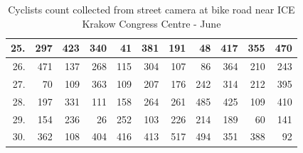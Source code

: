 \begin{table}[H]
{\begin{tabular}{|r|r|r|r|r|r|r|r|r|r|r|}
25.                    & 297                            & 423                             & 340                              & 41                               & 381                              & 191                              & 48                               & 417                              & 355                              & 470                              \\ \hline
26.                    & 471                            & 137                             & 268                              & 115                              & 304                              & 107                              & 86                               & 364                              & 210                              & 243                              \\ \hline
27.                    & 70                             & 109                             & 363                              & 109                              & 207                              & 176                              & 242                              & 314                              & 212                              & 395                              \\ \hline
28.                    & 197                            & 331                             & 111                              & 158                              & 264                              & 261                              & 485                              & 425                              & 109                              & 410                              \\ \hline
29.                    & 154                            & 236                             & 26                               & 252                              & 103                              & 226                              & 214                              & 189                              & 60                               & 141                              \\ \hline
30.                    & 362                            & 108                             & 404                              & 416                              & 413                              & 517                              & 494                              & 351                              & 388                              & 92                               \\ \hline
\end{tabular}}
\caption{Cyclists count collected from street camera at bike road near ICE Krakow Congress Centre - June}
\label{tab:iceCountJune}
\end{table}
